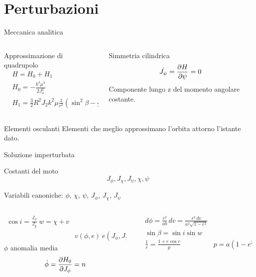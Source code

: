 \section{Perturbazioni}

\begin{frame}{Meccanica analitica}
\begin{columns}  \begin{column}{0.5\textwidth}
\begin{block}{Approssimazione di quadrupolo}
\begin{align*}
&H=H_0+H_1\\
&H_0=-\frac{k^4\mu^3}{2J_{\phi}^2}\\
&H_1=\frac{3}{2}R^2J_2k^2\mu\frac{1}{r^3}(\sin^2{\beta}-\frac{1}{3})
\end{align*}
\end{block}
\end{column}
\begin{column}{0.5\textwidth}
\begin{block}{Simmetria cilindrica}
\begin{equation*}
\dot{J_{\psi}}=\PDy{\psi}{H}=0
\end{equation*}
Componente lungo z del momento angolare costante.
\end{block}
\end{column}  \end{columns}
\begin{block}{Elementi osculanti}
Elementi che meglio approssimano l'orbita attorno l'istante dato.
\end{block}
\end{frame}

\begin{wordonframe}{Soluzione imperturbata}
\begin{block}{Costanti del moto}
\begin{equation*}
J_{\phi}, J_{\chi}, J_{\psi}, \chi, \psi
\end{equation*}
\end{block}
Variabili canoniche: $\phi$, $\chi$, $\psi$, $J_{\phi}$, $J_{\chi}$, $J_{\psi}$
\begin{columns}  \begin{column}{0.5\textwidth}
\begin{align*}
\cos{i}=\frac{J_{\psi}}{J_{\chi}}\ w=\chi+v\\
&v(\phi,e)\ e(J_{\phi},J_{\chi})
\end{align*}
$\phi$ anomalia media
\begin{equation*}
\dot{\phi}=\PDy{J_{\phi}}{H_0}=n
\end{equation*}
\end{column} \begin{column}{0.5\textwidth}
\begin{align*}
&d\phi=\frac{r^2}{ab}\,dv=\frac{r^2\,dv}{a^2\sqrt{1-e^2}}\\
&\sin{\beta}=\sin{i}\sin{w}\\
&\frac{1}{r}=\frac{1+e\cos{v}}{p}
&p=a(1-e^2)
\end{align*}
\end{column}  \end{columns}
\end{wordonframe}

